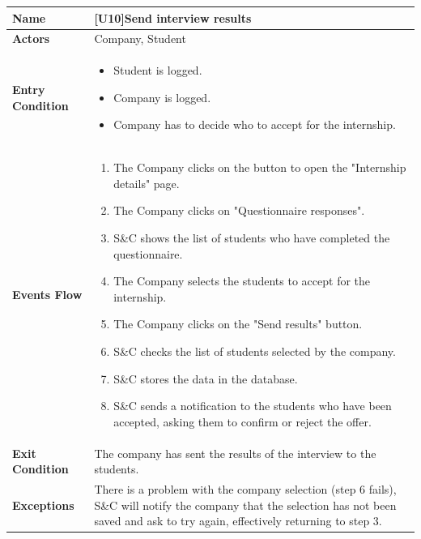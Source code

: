 \begin{center}
    \begin{tabular}{|p{9em}|p{27em}|}
        \hline
        \rowcolor{bluepoli!40} %
        \textbf{Name} & \textbf{[U10]Send interview results} \\
        \hline
        \textbf{Actors} & Company, Student\\
        \hline
        \textbf{Entry Condition} & 
        \begin{itemize}
            \item Student is logged.
            \item Company is logged.
            \item Company has to decide who to accept for the internship.
        \end{itemize} \\
        \hline
        \textbf{Events Flow} & 
        \begin{enumerate}
            \item The Company clicks on the button to open the "Internship details" page.
            \item The Company clicks on "Questionnaire responses".
            \item S\&C shows the list of students who have completed the questionnaire.
            \item The Company selects the students to accept for the internship.
            \item The Company clicks on the "Send results" button.
            \item S\&C checks the list of students selected by the company.
            \item S\&C stores the data in the database.
            \item S\&C sends a notification to the students who have been accepted, asking them to confirm or reject the offer.
        \end{enumerate} \\
        \hline
        \textbf{Exit Condition} & The company has sent the results of the interview to the students.\\
        \hline
        \textbf{Exceptions} & There is a problem with the company selection (step 6 fails), S\&C will notify the company that the selection
        has not been saved and ask to try again, effectively returning to step 3.\\
        \hline
    \end{tabular}
\end{center}

